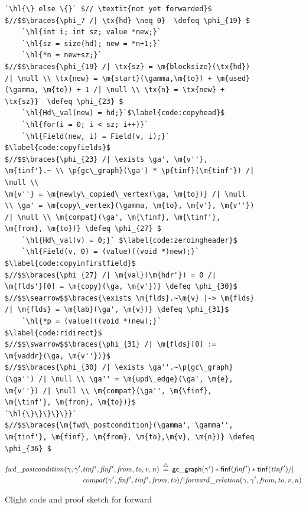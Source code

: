 \documentclass[acmsmall,screen]{acmart}
\makeatletter
\newcommand{\finf}{finf}
\newcommand{\tinf}{tinf}
\newcommand{\braces}[1]{\left\{\!\!\!\begin{array}{l@{}} #1 \end{array}\right\}}
\newcommand{\ga}{\gamma}
\newcommand{\defeq}{\mathbin{\stackrel{\triangle}{=}}}
\newcommand{\tx}[1]{\text{#1}}
\newcommand{\p}[1]{\ensuremath{\mathsf{#1}}} \newcommand{\m}[1]{\ensuremath{\mathit{#1}}} \newcommand{\ma}[1]{\ensuremath{\mathcal{#1}}} \let\ramify\lightning
\newcommand{\hl}[1]{\colorbox{lightgray}{#1}}
\makeatother
\begin{document}
\begin{figure}[!ht]
\begin{lstlisting}[multicols=2]
   `\hl{\} else \{}` $// \textit{not yet forwarded}$
$//$$\braces{\phi_7 /| \tx{hd} \neq 0}  \defeq \phi_{19} $
    `\hl{int i; int sz; value *new;}`
    `\hl{sz = size(hd); new = *n+1;}`
    `\hl{*n = new+sz;}`
$//$$\braces{\phi_{19} /| \tx{sz} = \m{blocksize}(\tx{hd}) /| \null \\ \tx{new} = \m{start}(\gamma,\m{to}) + \m{used}(\gamma, \m{to}) + 1 /| \null \\ \tx{n} = \tx{new} + \tx{sz}}  \defeq \phi_{23} $      
    `\hl{Hd\_val(new) = hd;}`$\label{code:copyhead}$
    `\hl{for(i = 0; i < sz; i++)}` 
    `\hl{Field(new, i) = Field(v, i);}` $\label{code:copyfields}$
$//$$\braces{\phi_{23} /| \exists \ga', \m{v''}, \m{tinf'}.~ \\ \p{gc\_graph}(\ga') * \p{tinf}(\m{tinf'}) /| \null \\ 
\m{v''} = \m{newly\_copied\_vertex(\ga, \m{to})} /| \null \\ \ga' = \m{copy\_vertex}(\gamma, \m{to}, \m{v'}, \m{v''}) /| \null \\ \m{compat}(\ga', \m{\finf}, \m{\tinf'}, \m{from}, \m{to})} \defeq \phi_{27} $
    `\hl{Hd\_val(v) = 0;}` $\label{code:zeroingheader}$
    `\hl{Field(v, 0) = (value)((void *)new);}` $\label{code:copyinfirstfield}$
$//$$\braces{\phi_{27} /| \m{val}(\m{hdr'}) = 0 /| \m{flds'}[0] = \m{copy}(\ga, \m{v'})} \defeq \phi_{30}$
$//$$\searrow$$\braces{\exists \m{flds}.~\m{v} |-> \m{flds} /| \m{flds} = \m{lab}(\ga', \m{v})} \defeq \phi_{31}$
    `\hl{*p = (value)((void *)new);}` $\label{code:ridirect}$
$//$$\swarrow$$\braces{\phi_{31} /| \m{flds}[0] := \m{vaddr}(\ga, \m{v''})}$
$//$$\braces{\phi_{30} /| \exists \ga''.~\p{gc\_graph}(\ga'') /| \null \\ \ga'' = \m{upd\_edge}(\ga', \m{e}, \m{v''}) /| \null \\ \m{compat}(\ga'', \m{\finf}, \m{\tinf'}, \m{from}, \m{to})}$
`\hl{\}\}\}\}\}}`
$//$$\braces{\m{fwd\_postcondition}(\gamma', \gamma'', \m{tinf'}, \m{finf}, \m{from}, \m{to},\m{v}, \m{n})} \defeq \phi_{36} $
\end{lstlisting}
\footnotesize{
\vspace{-0.8em}
\begin{equation*}
\begin{split}
\m{fwd\_postcondition}(\gamma, \ga', &\m{tinf'}, \m{finf'}, \m{from}, \m{to}, \m{v}, \m{n}) \; \defeq \; 
   \p{gc{\_}graph}(\ga') * \p{\finf}(\m{\finf'}) * \p{\tinf}(\m{\tinf'}) /| \null \\
   &\m{compat}(\ga', \m{\finf'}, \m{\tinf'}, \m{from}, \m{to}) /|
   \m{forward\_relation}(\ga, \ga', \m{from}, \m{to}, \m{v}, \m{n})
\end{split}
\end{equation*}

}
\vspace{-0.4em}
\caption{Clight code and proof sketch for forward}
\label{fig:forward}
\vspace{-1em}
\end{figure}
\end{document}
